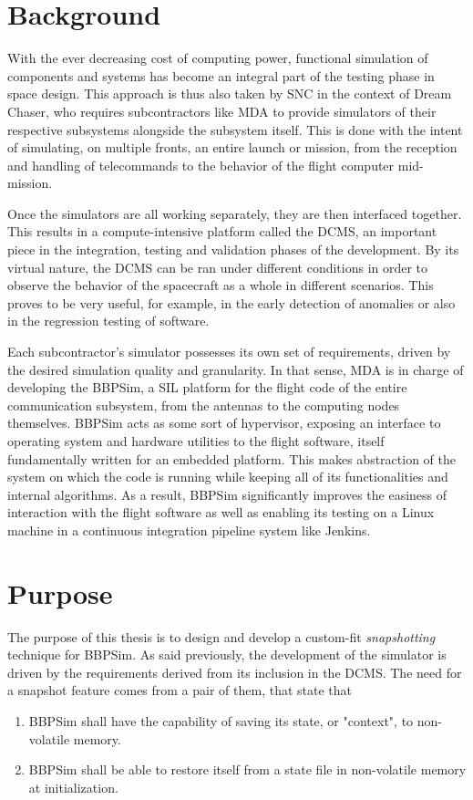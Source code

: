 \section{Background}
With the ever decreasing cost of computing power, functional simulation of components and systems has become an integral part of the testing phase in space design. This approach is thus also taken by \gls{SNC} in the context of Dream Chaser, who requires subcontractors like \gls{MDA} to provide simulators of their respective subsystems alongside the subsystem itself. This is done with the intent of simulating, on multiple fronts, an entire launch or mission, from the reception and handling of telecommands to the behavior of the flight computer mid-mission. 

Once the simulators are all working separately, they are then interfaced together. This results in a compute-intensive platform called the \gls{DCMS}, an important piece in the integration, testing and validation phases of the development. By its virtual nature, the \gls{DCMS} can be ran under different conditions in order to observe the behavior of the spacecraft as a whole in different scenarios. This proves to be  very useful, for example, in the early detection of anomalies or also in the regression testing of software.

Each subcontractor's simulator possesses its own set of requirements, driven by the desired simulation quality and granularity. In that sense, \gls{MDA} is in charge of developing the \gls{BBPSim}, a \gls{SIL} platform for the flight code of the entire communication subsystem, from the antennas to the computing nodes themselves. \gls{BBPSim} acts as some sort of hypervisor, exposing an interface to operating system and hardware utilities to the flight software, itself fundamentally written for an embedded platform. This makes abstraction of the system on which the code is running while keeping all of its functionalities and internal algorithms. As a result, \gls{BBPSim} significantly improves the easiness of interaction with the flight software as well as enabling its testing on a Linux machine in a continuous integration pipeline system like Jenkins.

\section{Purpose}
The purpose of this thesis is to design and develop a custom-fit \textit{snapshotting} technique for \gls{BBPSim}. As said previously, the development of the simulator is driven by the requirements derived from its inclusion in the DCMS. The need for a snapshot feature comes from a pair of them, that state that
\begin{enumerate}
	\item \gls{BBPSim} shall have the capability of saving its state, or "context", to non-volatile memory.
	\item \gls{BBPSim} shall be able to restore itself from a state file in non-volatile memory at initialization.
\end{enumerate} 

